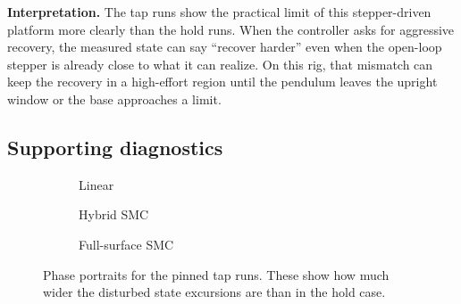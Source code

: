 \noindent\textbf{Interpretation.} The tap runs show the practical limit of this stepper-driven platform more clearly than the hold runs. When the controller asks for aggressive recovery, the measured state can say ``recover harder'' even when the open-loop stepper is already close to what it can realize. On this rig, that mismatch can keep the recovery in a high-effort region until the pendulum leaves the upright window or the base approaches a limit.

\subsection*{Supporting diagnostics}

\begin{figure}[htbp]
  \centering
  \begin{subfigure}[t]{0.32\linewidth}
    \centering
    \caption{Linear}
  \end{subfigure}\hfill
  \begin{subfigure}[t]{0.32\linewidth}
    \centering
    \caption{Hybrid SMC}
  \end{subfigure}\hfill
  \begin{subfigure}[t]{0.32\linewidth}
    \centering
    \caption{Full-surface SMC}
  \end{subfigure}
  \caption{Phase portraits for the pinned tap runs. These show how much wider the disturbed state excursions are than in the hold case.}
  \label{fig:tap_phase_support}
\end{figure}

